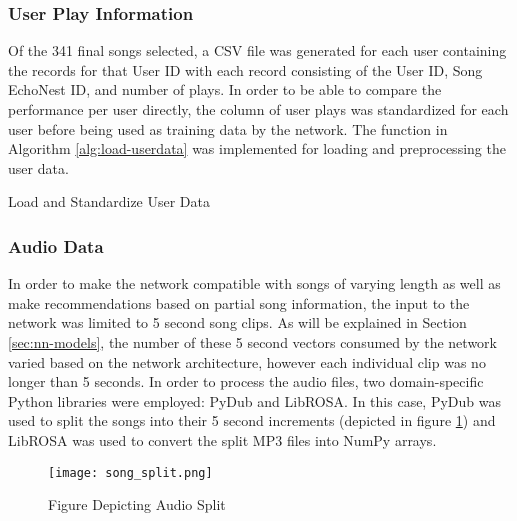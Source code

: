         \subsubsection{User Play Information}
        Of the 341 final songs selected, a CSV file was generated for each user containing the records for that User ID with each record consisting of the User ID, Song EchoNest ID, and number of plays. In order to be able to compare the performance per user directly, the column of user plays was standardized for each user before being used as training data by the network. The function in Algorithm \ref{alg:load-userdata} was implemented for loading and preprocessing the user data. 
        \begin{algorithm}[h]
        \caption{Load and Standardize User Data}
        \label{alg:load-userdata}
        \end{algorithm}

        \subsubsection{Audio Data}
        In order to make the network compatible with songs of varying length as well as make recommendations based on partial song information, the input to the network was limited to 5 second song clips. As will be explained in Section \ref{sec:nn-models}, the number of these 5 second vectors consumed by the network varied based on the network architecture, however each individual clip was no longer than 5 seconds. In order to process the audio files, two domain-specific Python libraries were employed: PyDub and LibROSA. \cite{librosa-site,pydub-site} In this case, PyDub was used to split the songs into their 5 second increments (depicted in figure \ref{fig:audio-split}) and LibROSA was used to convert the split MP3 files into NumPy arrays.
        \begin{figure}[H]
            \texttt{[image: song\_split.png]}
              \caption{Figure Depicting Audio Split}
              \label{fig:audio-split}
        \end{figure}
